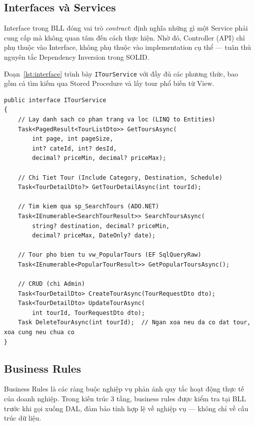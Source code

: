 \subsection{Interfaces và Services}\label{sub3.3.1}

Interface trong BLL đóng vai trò \textit{contract}: định nghĩa
những gì một Service phải cung cấp mà không quan tâm đến cách
thực hiện. Nhờ đó, Controller (API) chỉ phụ thuộc vào Interface,
không phụ thuộc vào implementation cụ thể — tuân thủ nguyên tắc
Dependency Inversion trong SOLID.

Đoạn~\ref{lst:interface} trình bày \texttt{ITourService} với
đầy đủ các phương thức, bao gồm cả tìm kiếm qua Stored
Procedure và lấy tour phổ biến từ View.

\begin{lstlisting}[style=csharp,
  caption={ITourService -- Interface của BLL},
  label={lst:interface}]
public interface ITourService
{
    // Lay danh sach co phan trang va loc (LINQ to Entities)
    Task<PagedResult<TourListDto>> GetToursAsync(
        int page, int pageSize,
        int? cateId, int? desId,
        decimal? priceMin, decimal? priceMax);

    // Chi Tiet Tour (Include Category, Destination, Schedule)
    Task<TourDetailDto?> GetTourDetailAsync(int tourId);

    // Tim kiem qua sp_SearchTours (ADO.NET)
    Task<IEnumerable<SearchTourResult>> SearchToursAsync(
        string? destination, decimal? priceMin,
        decimal? priceMax, DateOnly? date);

    // Tour pho bien tu vw_PopularTours (EF SqlQueryRaw)
    Task<IEnumerable<PopularTourResult>> GetPopularToursAsync();

    // CRUD (chi Admin)
    Task<TourDetailDto> CreateTourAsync(TourRequestDto dto);
    Task<TourDetailDto> UpdateTourAsync(
        int tourId, TourRequestDto dto);
    Task DeleteTourAsync(int tourId);  // Ngan xoa neu da co dat tour, xoa cung neu chua co
}
\end{lstlisting}

\subsection{Business Rules}\label{sub3.3.2}

Business Rules là các ràng buộc nghiệp vụ phản ánh quy tắc
hoạt động thực tế của doanh nghiệp. Trong kiến trúc 3 tầng,
business rules được kiểm tra tại BLL trước khi gọi xuống DAL,
đảm bảo tính hợp lệ về nghiệp vụ — không chỉ về cấu trúc dữ liệu.

